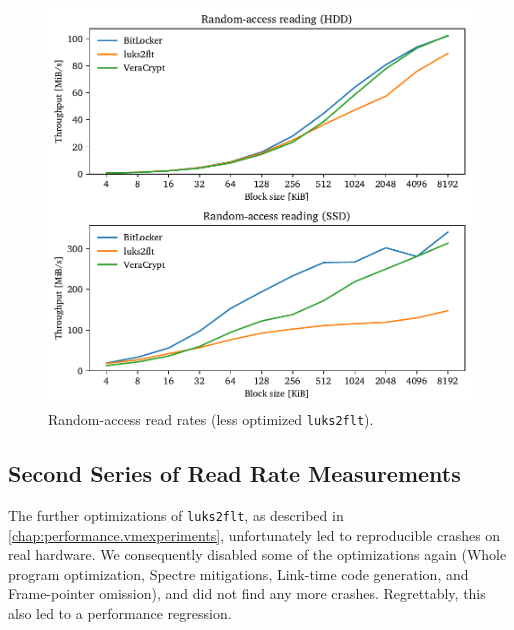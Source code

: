 \begin{figure}[htb!]
	\center
	\includegraphics[scale=1]{../fig/performance.hwexperiments.beforeoptrand.pdf}
	\caption[
		Random-access read rates (less optimized \texttt{luks2flt})
	]{
		Random-access read rates (less optimized \texttt{luks2flt}). 
	}
	\label{fig:performance.hwexperiments.beforeoptrand}
\end{figure}

\subsection{Second Series of Read Rate Measurements}
\label{chap:performance.hwexperiments.encryptedseries2}
The further optimizations of \texttt{luks2flt}, as described in \autoref{chap:performance.vmexperiments}, unfortunately led to reproducible crashes on real hardware.  We consequently disabled some of the optimizations again (Whole program optimization, Spectre mitigations, Link-time code generation, and Frame-pointer omission), and did not find any more crashes. Regrettably, this also led to a performance regression. 

